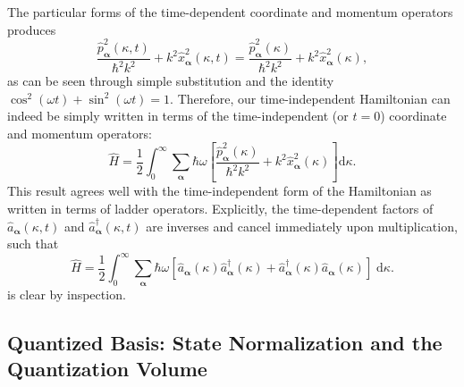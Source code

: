 \documentclass{article}
\numberwithin{equation}{section}
\begin{document}
The particular forms of the time-dependent coordinate and momentum operators produces
\begin{equation}
\frac{\hat{p}_{\bm{\alpha}}^2(\kappa,t)}{\hbar^2k^2} + k^2\hat{x}_{\bm{\alpha}}^2(\kappa,t) = \frac{\hat{p}_{\bm{\alpha}}^2(\kappa)}{\hbar^2k^2} + k^2\hat{x}_{\bm{\alpha}}^2(\kappa),
\end{equation}
as can be seen through simple substitution and the identity $\cos^2(\omega t) + \sin^2(\omega t) = 1$. Therefore, our time-independent Hamiltonian can indeed be simply written in terms of the time-independent (or $t = 0$) coordinate and momentum operators:
\begin{equation}\label{eq:Hhat3}
\hat{H} = \frac{1}{2}\int_0^{\infty}\sum_{\bm{\alpha}}\hbar\omega\left[\frac{\hat{p}_{\bm{\alpha}}^2(\kappa)}{\hbar^2 k^2} + k^2\hat{x}^2_{\bm{\alpha}}(\kappa)\right]\mathrm{d}\kappa.
\end{equation}
This result agrees well with the time-independent form of the Hamiltonian as written in terms of ladder operators. Explicitly, the time-dependent factors of $\hat{a}_{\bm{\alpha}}(\kappa,t)$ and $\hat{a}_{\bm{\alpha}}^\dagger(\kappa,t)$ are inverses and cancel immediately upon multiplication, such that
\begin{equation}\label{eq:Hhat4}
\hat{H} = \frac{1}{2}\int_0^\infty\sum_{\bm{\alpha}}\hbar\omega\left[\hat{a}_{\bm{\alpha}}(\kappa)\hat{a}_{\bm{\alpha}}^\dagger(\kappa) + \hat{a}_{\bm{\alpha}}^\dagger(\kappa)\hat{a}_{\bm{\alpha}}(\kappa)\right]\;\mathrm{d}\kappa.
\end{equation}
is clear by inspection.













\subsection{Quantized Basis: State Normalization and the Quantization Volume}
\end{document}
